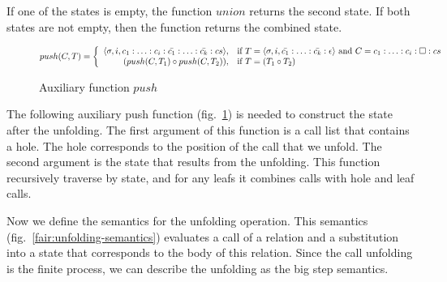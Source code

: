 
If one of the states is empty, the function $union$ returns the second state. If both states are not empty, then the function returns the combined state.

\begin{figure}[h!]
\[
push(C, T) =
\left\{
\begin{array}{rl}
\langle \sigma, i, c_1 : \ldots : c_i : \bar{c_1} : \ldots : \bar{c_k} : cs \rangle, & \mbox{if } T = \langle \sigma, i, \bar{c_1} : \ldots : \bar{c_k} : \epsilon \rangle \mbox{ and } C = c_1 : \ldots : c_i : \Box : cs \\
(push(C, T_1) \circ push(C, T_2)), & \mbox{if } T = (T_1 \circ T_2)
\end{array}
\right.
\]
\caption{Auxiliary function $push$}
\label{fair:push-semantics}
\end{figure}


The following auxiliary push function (fig.~\ref{fair:push-semantics}) is needed to construct the state after the unfolding.
The first argument of this function is a call list that contains a hole.
The hole corresponds to the position of the call that we unfold.
The second argument is the state that results from the unfolding.
This function recursively traverse by state, and for any leafs it combines calls with hole and leaf calls.

Now we define the semantics for the unfolding operation. This semantics (fig.~\ref{fair:unfolding-semantics}) evaluates a call of a relation and a substitution into a state that corresponds to the body of this relation. Since the call unfolding is the finite process, we can describe the unfolding as the big step semantics.

